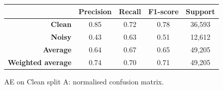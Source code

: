 \documentclass[a4paper,10pt]{article}
\begin{document}
\begin{figure}[p]
{\begin{minipage}{0.6\textwidth}
			\caption{AE on Clean split A: normalised confusion matrix.}
			\label{fig:ae_clean_a_cm}
		\end{minipage}
	}
	\baselineskip
	\begin{tabular}{r|c|c|c|c}
		                          & \textbf{Precision} & \textbf{Recall} & \textbf{F1-score} & \textbf{Support} \\ \midrule
		\textbf{Clean}            & 0.85               & 0.72            & 0.78              & 36,593           \\
		\textbf{Noisy}            & 0.43               & 0.63            & 0.51              & 12,612           \\ \midrule
		\textbf{Average}          & 0.64               & 0.67            & 0.65              & 49,205           \\
		\textbf{Weighted average} & 0.74               & 0.70            & 0.71              & 49,205
	\end{tabular}
	\label{tab:ae_clean_a_cr}
\end{figure}
\end{document}

